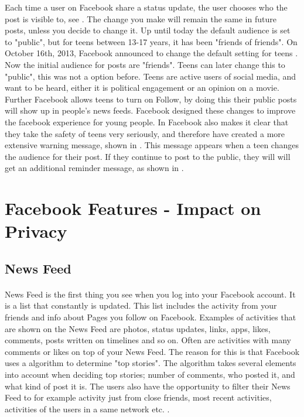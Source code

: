 Each time a user on Facebook share a status update, the user chooses who the post is visible to, see . The change you make will remain the same in future posts, unless you decide to change it. Up until today the default audience is set to "public", but for teens between 13-17 years, it has been "friends of friends". On October 16th, 2013, Facebook announced to change the default setting for teens \cite{defaultTeens}. Now the initial audience for posts are "friends". Teens can later change this to "public", this was not a option before. Teens are active users of social media, and want to be heard, either it is political engagement or an opinion on a movie. Further Facebook allows teens to turn on Follow, by doing this their public posts will show up in people's news feeds. Facebook designed these changes to improve the facebook experience for young people. In \cite{defaultTeens} Facebook also makes it clear that they take the safety of teens very seriously, and therefore have created a more extensive warning message, shown in  . This message appears when a teen changes the audience for their post. If they continue to post to the public, they will will get an additional reminder message, as shown in  .

\section{Facebook Features - Impact on Privacy}\label{sec:facebook_features}

\subsection{News Feed}
\paragraph{}
News Feed is the first thing you see when you log into your Facebook account. It is a list that constantly is updated. This list includes the activity from your friends and info about Pages you follow on Facebook. Examples of activities that are shown on the News Feed are photos, status updates, links, apps, likes, comments, posts written on timelines and so on. Often are activities with many comments or likes on top of your News Feed. The reason for this is that Facebook uses a algorithm to determine "top stories". The algorithm takes several elements into account when deciding top stories; number of comments, who posted it, and what kind of post it is. The users also have the opportunity to filter their News Feed to for example activity just from close friends, most recent activities, activities of the users in a same network etc. \cite{newsfeed}.

